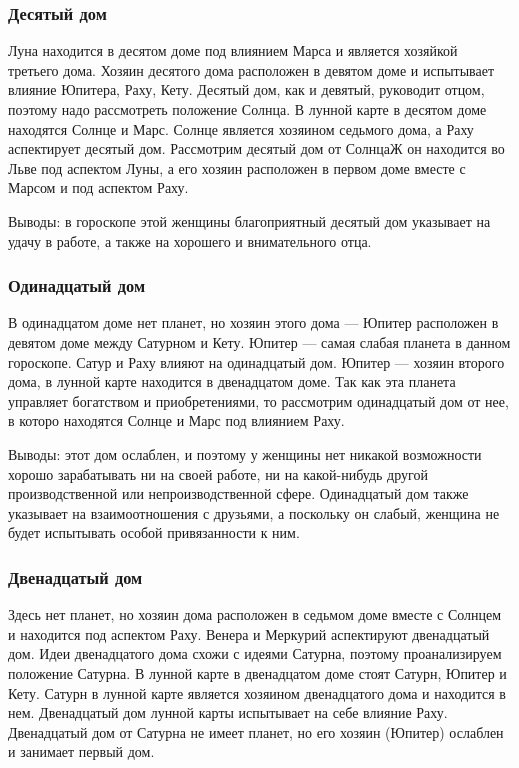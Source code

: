\subsubsection*{Десятый дом}
Луна находится в десятом доме под влиянием Марса и является хозяйкой третьего дома. Хозяин десятого дома расположен в девятом доме и испытывает влияние Юпитера, Раху, Кету. Десятый дом, как и девятый, руководит отцом, поэтому надо рассмотреть положение Солнца. В лунной карте в десятом доме находятся Солнце и Марс. Солнце является хозяином седьмого дома, а Раху аспектирует десятый дом. Рассмотрим десятый дом от СолнцаЖ он находится во Льве под аспектом Луны, а его хозяин расположен в первом доме вместе с Марсом и под аспектом Раху.

Выводы: в гороскопе этой женщины благоприятный десятый дом указывает на удачу в работе, а также на хорошего и внимательного отца.

\subsubsection*{Одинадцатый дом}
В одинадцатом доме нет планет, но хозяин этого дома --- Юпитер расположен в девятом доме между Сатурном и Кету. Юпитер --- самая слабая планета в данном гороскопе. Сатур и Раху влияют на одинадцатый дом. Юпитер --- хозяин второго дома, в лунной карте находится в двенадцатом доме. Так как эта планета управляет богатством и приобретениями, то рассмотрим одинадцатый дом от нее, в которо находятся Солнце и Марс под влиянием Раху.

Выводы: этот дом ослаблен, и поэтому у женщины нет никакой возможности хорошо зарабатывать ни на своей работе, ни на какой-нибудь другой производственной или непроизводственной сфере. Одинадцатый дом также указывает на взаимоотношения с друзьями, а поскольку он слабый, женщина не будет испытывать особой привязанности к ним.

\subsubsection*{Двенадцатый дом}
Здесь нет планет, но хозяин дома расположен в седьмом доме вместе с Солнцем и находится под аспектом Раху. Венера и Меркурий аспектируют двенадцатый дом. Идеи двенадцатого дома схожи с идеями Сатурна, поэтому проанализируем положение Сатурна. В лунной карте в двенадцатом доме стоят Сатурн, Юпитер и Кету. Сатурн в лунной карте является хозяином двенадцатого дома и находится в нем. Двенадцатый дом лунной карты испытывает на себе влияние Раху. Двенадцатый дом от Сатурна не имеет планет, но его хозяин (Юпитер) ослаблен и занимает первый дом.

